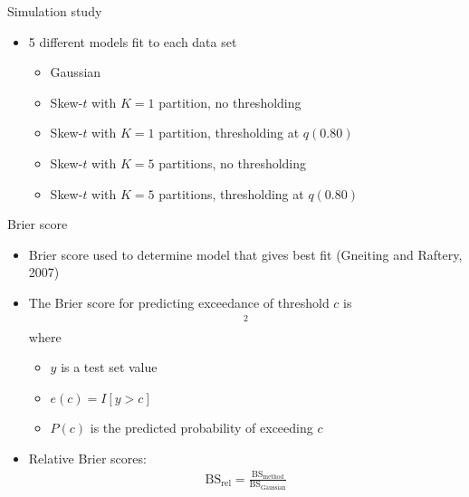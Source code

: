 \documentclass{beamer}
\begin{document}
\begin{frame}{Simulation study}
  \begin{itemize} \setlength{\itemsep}{1em}
    \item 5 different models fit to each data set
    \begin{itemize}
      \item Gaussian
      \item Skew-$t$ with $K = 1$ partition, no thresholding
      \item Skew-$t$ with $K = 1$ partition, thresholding at $q(0.80)$
      \item Skew-$t$ with $K = 5$ partitions, no thresholding
      \item Skew-$t$ with $K = 5$ partitions, thresholding at $q(0.80)$
    \end{itemize}
  \end{itemize}
\end{frame}


\begin{frame}{Brier score}
  \begin{itemize} \setlength{\itemsep}{1em}
    \item Brier score used to determine model that gives best fit (Gneiting and Raftery, 2007)
    \item The Brier score for predicting exceedance of threshold $c$ is
    \begin{align*}
      [e(c) - P(c)]^2
    \end{align*}
    where
    \begin{itemize}
      \item $y$ is a test set value
      \item $e(c) = I[y > c]$
      \item $P(c)$ is the predicted probability of exceeding $c$
    \end{itemize}
    \item Relative Brier scores:
    \begin{align*}
      \text{BS}_\text{rel} = \frac{ \text{BS}_\text{method}}{ \text{BS}_\text{Gaussian}}
    \end{align*}
  \end{itemize}
\end{frame}
\end{document}
